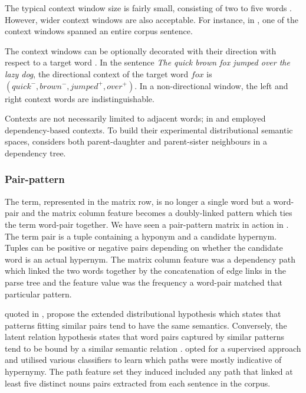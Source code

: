 The typical context window size is fairly small, consisting of two to five words \citep{roller2014inclusive, santus2014chasing, shwartz2017siege}.  However, wider context windows are also acceptable.  For instance, in \citep{roller2014inclusive}, one of the context windows spanned an entire corpus sentence.

The context windows can be optionally decorated with their direction with respect to a target word \citep{shwartz2017siege}.  In the sentence \textit{The quick brown fox jumped over the lazy dog}, the directional context of the target word $fox$ is $(quick^-, brown^-, jumped^+, over^+)$. In a non-directional window, the left and right context words are indistinguishable.   

Contexts are not necessarily limited to adjacent words; \citep{lin1998information} in \citep{turney2010frequency} and \citep{levy2014dependency} employed dependency-based contexts.  To build their experimental distributional semantic spaces, \citep{shwartz2017siege} considers both parent-daughter and parent-sister neighbours in a dependency tree.

\subsubsection{Pair-pattern}
The term, represented in the matrix row, is no longer a single word but a word-pair and the matrix column feature becomes a doubly-linked pattern which ties the term word-pair together.  We have seen a pair-pattern matrix in action in \citep{Snow2004}.  The term pair is a tuple containing a hyponym and a candidate hypernym.  Tuples can be positive or negative pairs depending on whether the candidate word is an actual hypernym.  The matrix column feature was a dependency path which linked the two words together by the concatenation of edge links in the parse tree and the feature value was the frequency a word-pair matched that particular pattern.

\citep{lin2001discovery} quoted in \citep{turney2010frequency}, propose the extended distributional hypothesis which states that patterns fitting similar pairs tend to have the same semantics.  Conversely, the latent relation hypothesis states that word pairs captured by similar patterns tend to be bound by a similar semantic relation \citep{turney2010frequency}.  \citep{Snow2004} opted for a supervised approach and utilised various classifiers to learn which paths were mostly indicative of hypernymy.  The path feature set they induced included any path that linked at least five distinct nouns pairs extracted from each sentence in the corpus.  

